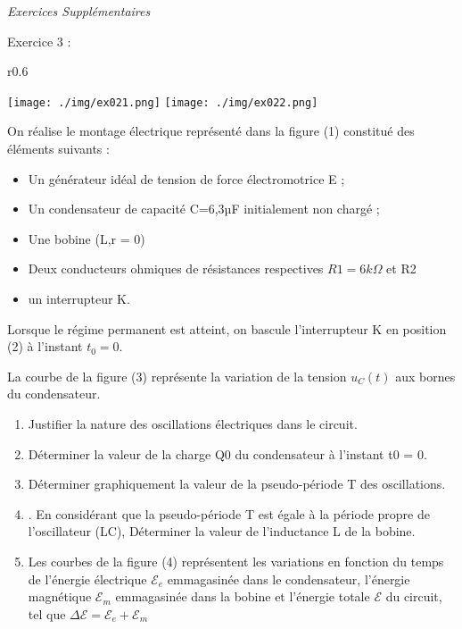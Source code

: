 \documentclass[12pt, french]{article}
\begin{document}
\begin{center}

\vspace{-0.7cm}
   \Large{ \em{Exercices Supplémentaires}}
\end{center}

\vspace{-0.7cm}





\begin{Box2}{Exercice 3 : }
	\begin{wrapfigure}[10]{r}{0.6\textwidth}
  \begin{center}
	\texttt{[image: ./img/ex021.png]}
	\texttt{[image: ./img/ex022.png]}
  \end{center}
\end{wrapfigure}

On réalise le montage électrique représenté dans la figure (1)
constitué des éléments suivants :
\begin{itemize}
	\item Un générateur idéal de tension de force
électromotrice E ;
\item  Un condensateur de capacité C=6,3µF
initialement non chargé ;
\item  Une bobine (L,r = 0)
\item  Deux conducteurs ohmiques de résistances respectives $R1 = 6k\Omega$ et R2 
\item  un interrupteur K.
\end{itemize}
Lorsque le régime permanent est atteint, on bascule l'interrupteur K en position (2) à l'instant $t_0 = 0$.

La courbe de la figure (3) représente la variation de la tension $u_C(t)$ aux bornes du condensateur.

\begin{enumerate}
	\item Justifier la nature des oscillations électriques dans le circuit.
	\item  Déterminer la valeur de la charge Q0 du condensateur à l'instant t0 = 0.

	\item Déterminer graphiquement la valeur de la pseudo-période T
des oscillations.

\item . En considérant que la pseudo-période T est égale à la période
propre de l'oscillateur (LC),
Déterminer la valeur de l'inductance L de la bobine.
\item Les courbes de la figure (4) représentent les variations en
	fonction du temps de l'énergie électrique $\mathscr{E}_e$ emmagasinée dans le condensateur, l'énergie magnétique $\mathscr{E}_m$ emmagasinée
dans la bobine et l'énergie totale $\mathscr{E}$ du circuit, tel que $\Delta{\mathscr{E}} =\mathscr{E}_e + \mathscr{E}_m$


\end{enumerate}
\end{Box2}
\end{document}
